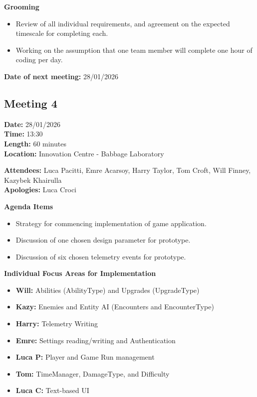 \documentclass[11pt]{article}
\begin{document}
    \textbf{Grooming}
    \begin{itemize}
        \item Review of all individual requirements, and agreement on the expected timescale for completing each.
        \item Working on the assumption that one team member will complete one hour of coding per day.
    \end{itemize}

    \textbf{Date of next meeting:} 28/01/2026



    \vspace{1.5\baselineskip}
    \subsection{Meeting 4}

    \textbf{Date:} 28/01/2026 \\
    \textbf{Time:} 13:30 \\
    \textbf{Length:} 60 minutes \\
    \textbf{Location:} Innovation Centre - Babbage Laboratory

    \textbf{Attendees:} Luca Pacitti, Emre Acarsoy, Harry Taylor, Tom Croft, Will Finney, Kazybek Khairulla \\
    \textbf{Apologies:} Luca Croci

    \textbf{Agenda Items}
    \begin{itemize}
        \item Strategy for commencing implementation of game application.
        \item Discussion of one chosen design parameter for prototype.
        \item Discussion of six chosen telemetry events for prototype.
    \end{itemize}

    \textbf{Individual Focus Areas for Implementation}
    \begin{itemize}
        \item \textbf{Will:} Abilities (AbilityType) and Upgrades (UpgradeType)
        \item \textbf{Kazy:} Enemies and Entity AI (Encounters and EncounterType)
        \item \textbf{Harry:} Telemetry Writing
        \item \textbf{Emre:} Settings reading/writing and Authentication
        \item \textbf{Luca P:} Player and Game Run management
        \item \textbf{Tom:} TimeManager, DamageType, and Difficulty
        \item \textbf{Luca C:} Text-based UI
    \end{itemize}
\end{document}
